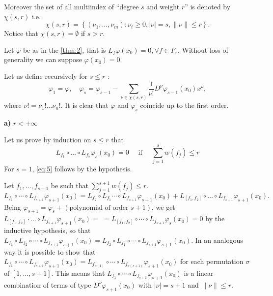 \documentclass{article}
\begin{document}
Moreover the set of all multiindex of ``degree $s$ and weight $r$'' is denoted by $\chi(s, r)$ i.e.
\begin{equation*}
	\chi(s, r)=\left\{\left(\nu_1, \ldots, \nu_m\right): \nu_i \geq 0, |\nu|=s, \|\nu\| \leq r\right\} .
\end{equation*}
Notice that $\chi(s, r)=\emptyset$ if $s>r$.

Let $\varphi$ be as in the \cref{thm:2}, that is $L_f \varphi\left(x_0\right)=0, \forall f \in F_r$. 
Without loss of generality we can suppose $\varphi\left(x_0\right)=0$.

Let us define recursively for $s \leq r$ :
\begin{equation*}
	\varphi_1=\varphi, \quad 
	\varphi_s=\varphi_{s-1}-\sum_{\nu \in \chi(s, r)} \frac{1}{\nu!} D^\nu \varphi_{s-1}\left(x_0\right) x^\nu,
\end{equation*}
where $\nu !=\nu_{1} ! \ldots \nu_{n} !$.
It is clear that $\varphi$ and $\varphi_s$ coincide up to the first order.

\bigskip

\textbf{a)} \underline{$r < +\infty$}

Let us prove by induction on $s \leq r$ that
\begin{equation} \label{eq:5}
	L_{f_1} \circ \ldots \circ L_{f_s} \varphi_s\left(x_0\right)=0 
	\quad \text { if } \quad 
	\sum_{j=1}^s w\left(f_j\right) \leq r
\end{equation}
For $s=1$, \eqref{eq:5} follows by the hypothesis.

Let $f_1, \ldots, f_{s+1}$ be such that $\sum_{j=1}^{s+1} w\left(f_j\right) \leq r$.
\begin{equation*}
	L_{f_1} \circ \cdots \circ L_{f_{s+1}} \varphi_{s+1}\left(x_0\right)
	= L_{f_2} \circ L_{f_1} \cdots \circ L_{f_{s+1}} \varphi_{s+1}\left(x_0\right)+L_{\left[f_1, f_2\right]} \circ \ldots \circ L_{f_{s+1}} \varphi_{s+1}\left(x_0\right) \text {. }
\end{equation*}
Being $\varphi_{s+1}=\varphi_s + (\text{polynomial of order } s+1)$, we get $L_{\left[f_1, f_2\right]} \cdot \ldots \circ L_{f_{s+1}} \varphi_{s+1}\left(x_0\right)=$ $=L_{\left[f_1, f_2\right]} \circ \cdots \circ L_{f_{s+1}} \varphi_s\left(x_0\right)=0$ by the inductive hypothesis, so that
$L_{f_1} \circ L_{f_2} \circ \cdots \circ L_{f_{s+1}} \varphi_{s+1}\left(x_0\right)=L_{f_2} \circ L_{f_1} \circ \cdots \circ L_{f_{s+1}} \varphi_{s+1}\left(x_0\right)$.
In an analogous way it is possible to show that $L_{f_1} \circ \cdots \circ L_{f_{s+1}} \varphi_{s+1}\left(x_0\right)=L_{f_{\sigma(1)}} \circ \cdots \circ L_{f_{\sigma(s+1)}} \varphi_{s+1}\left(x_0\right)$ for each permutation $\sigma$ of $[1, \ldots, s+1]$. 
This means that $L_{f_1} \circ \cdots \circ L_{f_{s+1}} \varphi_{s+1}\left(x_0\right)$ is a linear combination of terms of type $D^\nu \varphi_{s+1}\left(x_0\right)$ with $|\nu|=s+1$ and $\|\nu\| \leq r$.
\end{document}
